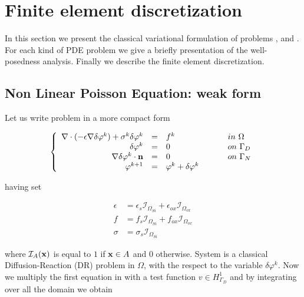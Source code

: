 \chapter{Finite element discretization}
\label{chap: finite element}

In this section we present the classical variational formulation of problems ,  and . For each kind of PDE problem we give a briefly presentation of the well-posedness analysis. Finally we describe the finite element discretization. 


\section{Non Linear Poisson Equation: weak form}
\label{sec: NLP weak form}

Let us write problem  in a more compact form

\begin{equation}
\label{sys: NLP general problem linearized}
\left\{
\begin{array}{rcll}
\nabla \cdot (-\epsilon \nabla \delta \varphi^k) + \sigma^k \delta \varphi^k & = &  f^k & \psp{15} in \psp{2} \Omega \\
\delta \varphi^k & = & 0 & \psp{15} on \psp{2} \Gamma_D \\
\nabla \delta \varphi ^k\cdot \vect{n} & = & 0 & \psp{15} on \psp{2} \Gamma_N
\\
\varphi^{k+1} & = & \varphi^k + \delta \varphi^k
\end{array}
\right.
\end{equation}

having set

\begin{align*}
\epsilon & = \epsilon_s \mathcal{I}_{\Omega_{Si}} + \epsilon_{ox} \mathcal{I}_{\Omega_{ox}} \\
f & = f_s \mathcal{I}_{\Omega_{Si}} + f_{ox} \mathcal{I}_{\Omega_{ox}} \\
\sigma & = \sigma_s \mathcal{I}_{\Omega_{Si}}
\end{align*}

where $\mathcal{I}_A(\mathbf{x})$ is equal to $1$ if $\mathbf{x}\in A$ and $0$ otherwise.
System  is a classical Diffusion-Reaction (DR) problem in $\Omega$, with the respect to the variable $\delta \varphi^k$. 
Now we multiply the first equation in  with a test function $v \in H^1_{\Gamma_D}$ and by integrating over all the domain we obtain

